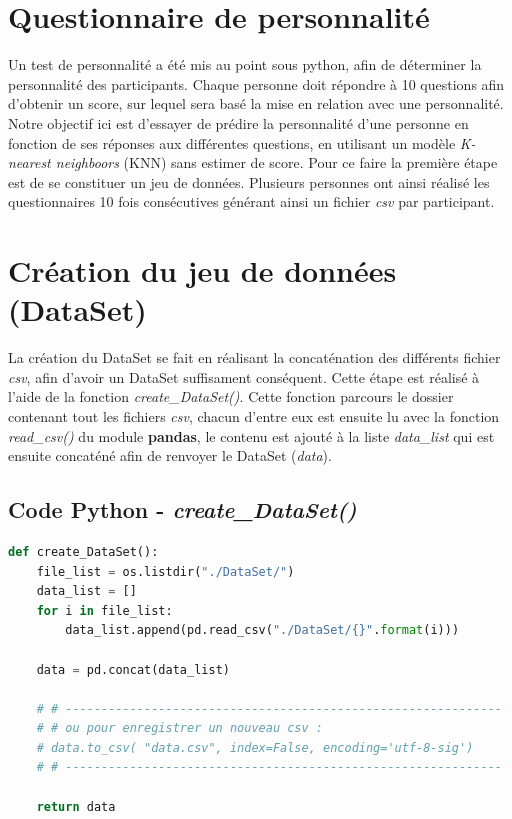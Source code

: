 \documentclass[french]{article}
\begin{document}
\newpage

\tableofcontents

\vspace{1cm}

\listoffigures

\newpage


\section{Questionnaire de personnalité}

Un test de personnalité a été mis au point sous python, afin de déterminer la personnalité des participants. Chaque personne doit répondre à 10 questions afin d'obtenir un score, sur lequel sera basé la mise en relation avec une personnalité.\\

Notre objectif ici est d'essayer de prédire la personnalité d'une personne en fonction de ses réponses aux différentes questions, en utilisant un modèle \textit{K-nearest neighboors} (KNN) sans estimer de score. Pour ce faire la première étape est de se constituer un jeu de données. Plusieurs personnes ont ainsi réalisé les questionnaires 10 fois consécutives générant ainsi un fichier \textit{csv} par participant.

\section{Création du jeu de données (DataSet)}

La création du DataSet se fait en réalisant la concaténation des différents fichier \textit{csv}, afin d'avoir un DataSet suffisament conséquent. Cette étape est réalisé à l'aide de la fonction \textit{create\_DataSet()}. Cette fonction parcours le dossier contenant tout les fichiers \textit{csv}, chacun d'entre eux est ensuite lu avec la fonction \textit{read\_csv()} du module \textbf{pandas}, le contenu est ajouté à la liste \textit{data\_list} qui est ensuite concaténé afin de renvoyer le DataSet (\textit{data}). 

\subsection{Code Python - \textit{create\_DataSet()}}

\begin{lstlisting}[language=Python]
def create_DataSet():
    file_list = os.listdir("./DataSet/")
    data_list = []
    for i in file_list:
        data_list.append(pd.read_csv("./DataSet/{}".format(i)))

    data = pd.concat(data_list)
    
    # # -------------------------------------------------------------
    # # ou pour enregistrer un nouveau csv :
    # data.to_csv( "data.csv", index=False, encoding='utf-8-sig')
    # # -------------------------------------------------------------

    return data
    
\end{lstlisting}
\end{document}
